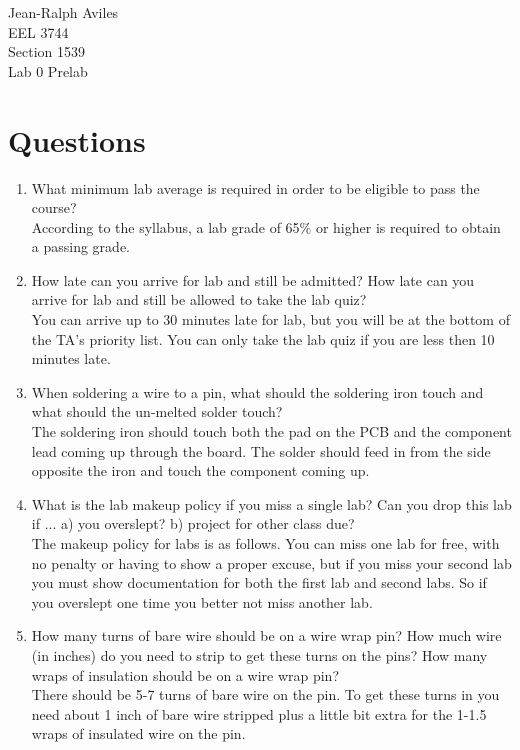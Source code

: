 \documentclass[12pt]{article}
\begin{document}
\begin{flushright}
Jean-Ralph Aviles\\
EEL 3744\\
Section 1539\\
Lab 0 Prelab\\
\end{flushright}

\section{Questions}
\begin{enumerate}
\item What minimum lab average is required in order to be
eligible to pass the course? \\
\hspace*{4ex} According to the syllabus, a lab grade of 65\% or higher is required to obtain a passing grade.
\item How late can you arrive for lab and still be admitted? How late can you arrive for lab and still be allowed to take the lab quiz? \\
\hspace*{4ex} You can arrive up to 30 minutes late for lab, but you will be at the bottom of the TA's priority list. You can only take the lab quiz if you are less then 10 minutes late.
\item When soldering a wire to a pin, what should the
soldering iron touch and what should the un-melted
solder touch?\\
\hspace*{4ex} The soldering iron should touch both the pad on the PCB and the component lead coming up through the board. The solder should feed in from the side opposite the iron and touch the component coming up.
\item What is the lab makeup policy if you miss a single
lab? Can you drop this lab if ... a) you overslept? b)
project for other class due? \\
\hspace*{4ex} The makeup policy for labs is as follows. You can miss one lab for free, with no penalty or having to show a proper excuse, but if you miss your second lab you must show documentation for both the first lab and second labs. So if you overslept one time you better not miss another lab.
\item How many turns of bare wire should be on a wire wrap pin? How much wire (in inches) do you need to strip to get these turns on the pins? How many wraps of insulation should be on a wire wrap pin? \\
\hspace*{4ex} There should be 5-7 turns of bare wire on the pin. To get these turns in you need about 1 inch of bare wire stripped plus a little bit extra for the 1-1.5 wraps of insulated wire on the pin.
\end{enumerate}
\end{document}
